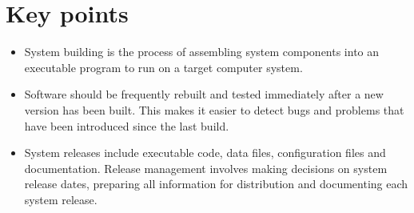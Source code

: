 \section{Key points}
\begin{itemize}
\item System building is the process of assembling system components into an executable program to run on a target computer system.

\item Software should be frequently rebuilt and tested immediately after a new version has been built. This makes it easier to detect bugs and problems that have been introduced since the last build.

\item System releases include executable code, data files, configuration files and documentation. Release management involves making decisions on system release dates, preparing all information for distribution and documenting each system release.
\end{itemize}
